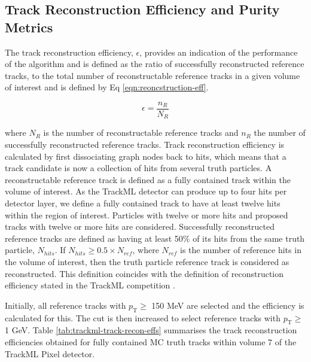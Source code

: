 \subsection{Track Reconstruction Efficiency and Purity Metrics}

The track reconstruction efficiency, $\epsilon$, provides an indication of the performance of the algorithm and is defined as the ratio of successfully reconstructed reference tracks, to the total number of reconstructable reference tracks in a given volume of interest and is defined by Eq \eqref{eqn:reoncstruction-eff}. 

\begin{equation}
    \epsilon = \frac{n_R}{N_R}
    \label{eqn:reoncstruction-eff}
\end{equation}

where $N_R$ is the number of reconstructable reference tracks and $n_R$ the number of successfully reconstructed reference tracks. Track reconstruction efficiency is calculated by first dissociating graph nodes back to hits, which means that a track candidate is now a collection of hits from several truth particles. A reconstructable reference track is defined as a fully contained track within the volume of interest. As the TrackML detector can produce up to four hits per detector layer, we define a fully contained track to have at least twelve hits within the region of interest. Particles with twelve or more hits and proposed tracks with twelve or more hits are considered. Successfully reconstructed reference tracks are defined as having at least 50\% of its hits from the same truth particle, $N_{hits}$. If $N_{hits} \geq 0.5 \times N_{ref}$, where $N_{ref}$ is the number of reference hits in the volume of interest, then the truth particle reference track is considered as reconstructed. This definition coincides with the definition of reconstruction efficiency stated in the TrackML competition \cite{kaggle-trackml}.

Initially, all reference tracks with $p_{\text{T}} \ge$ 150 MeV are selected and the efficiency is calculated for this. The cut is then increased to select reference tracks with $p_{\text{T}} \ge$ 1 GeV. Table \ref{tab:trackml-track-recon-effs} summarises the track reconstruction efficiencies obtained for fully contained MC truth tracks within volume 7 of the TrackML Pixel detector.


